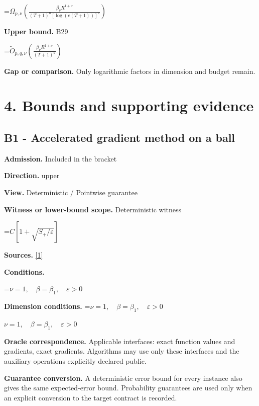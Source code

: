 \documentclass[10pt,a4paper]{article}
\newcommand{\AtlasMath}[1]{\par\begingroup\centering\setbox0=\hbox{$\displaystyle #1$}\ifdim\wd0>1.4\linewidth\typeout{ATLAS WIDE FORMULA: \the\wd0}\fi\ifdim\wd0>\linewidth\resizebox{\linewidth}{!}{\box0}\else\box0\fi\par\endgroup}
\newcommand{\AtlasInlineMath}[1]{\begingroup\setbox0=\hbox{$#1$}\ifdim\wd0>.4\linewidth\endgroup\AtlasMath{#1}\else\endgroup$#1$\fi}
\begin{document}
\AtlasMath{\Omega_{p,\nu}\!\left(\frac{\beta_\nu R^{1+\nu}}{(T+1)^a[\log(e(T+1))]^\nu}\right)}


\textbf{Upper bound.} B29



\AtlasMath{\widetilde O_{p,q,\nu}\!\left(\frac{\beta_\nu R^{1+\nu}}{(T+1)^a}\right)}


\textbf{Gap or comparison.} Only logarithmic factors in dimension and budget remain.



\section{4. Bounds and supporting evidence}


\subsection{B1 - Accelerated gradient method on a ball}


\textbf{Admission.} Included in the bracket



\textbf{Direction.} upper



\textbf{View.} Deterministic / Pointwise guarantee



\textbf{Witness or lower-bound scope.} Deterministic witness



\AtlasMath{C[1+\sqrt{S_+/\varepsilon}]}


\textbf{Sources.} \href{https://optimization-online.org/wp-content/uploads/2010/12/2865.pdf}{[1]}



\textbf{Conditions.}
\AtlasMath{\nu=1,\quad\beta=\beta_1,\quad\varepsilon>0}




\textbf{Dimension conditions.} \AtlasInlineMath{\nu=1,\quad\beta=\beta_1,\quad\varepsilon>0}



\textbf{Oracle correspondence.} Applicable interfaces: exact function values and gradients, exact gradients. Algorithms may use only these interfaces and the auxiliary operations explicitly declared public.



\textbf{Guarantee conversion.} A deterministic error bound for every instance also gives the same expected-error bound. Probability guarantees are used only when an explicit conversion to the target contract is recorded.
\end{document}
